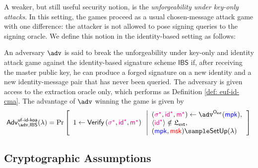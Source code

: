 \documentclass[version=submission, floatrow]{iacrcc}
\begin{document}
A weaker, but still useful security notion, is the \emph{unforgeability under key-only attacks}. In this setting, the games proceed as a usual chosen-message attack game with one difference: the attacker is not allowed to pose signing queries to the signing oracle. We define this notion in the identity-based setting as follows:
\begin{definition}\label{def: uf-id-koa}
    An adversary $\adv$ is said to break the unforgeability under key-only and identity attack game against the identity-based signature scheme $\mathsf{IBS}$ if, after receiving the master public key, he can produce a forged signature on a new identity and a new identity-message pair that has never been queried. The adversary is given access to the extraction oracle only, which performs as Definition \ref{def: euf-id-cma}. The advantage of $\adv$ winning the game is given by
    \begin{equation}
        \mathsf{Adv}_{\adv, \mathsf{IBS}}^{\mathsf{uf}\text{-}\mathsf{id}\text{-}\mathsf{koa}}(\lambda) =
    \Probability{\begin{array}{ll}
        \\
        1 \leftarrow \Verify{\Forge{\sigma}, \Forge{\id{}}, \Forge{\msg{}}} \\
        \\ 
    \end{array} 
    \left|
    \begin{array}{ll}
        \left(\Forge{\sigma}, \Forge{\id{}}, \Forge{\msg{}}\right) \leftarrow \adv^{\ExtractionOracle}(\mpk),\\
        \Braket{\Forge{\id{}}} \notin \mathfrak{L}_{\mathsf{ext}},\\
        (\mpk, \msk) \sample \mathsf{SetUp}(\lambda)  \\
    \end{array}\right.
    }
    \end{equation}
\end{definition}

\subsection{Cryptographic Assumptions}
\end{document}
